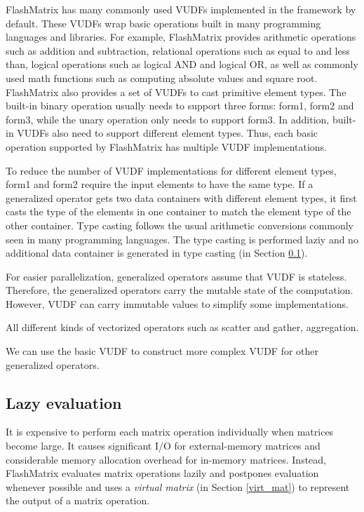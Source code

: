 FlashMatrix has many commonly used VUDFs implemented in the framework by default.
These VUDFs wrap basic operations built in many programming languages and
libraries. For example, FlashMatrix provides arithmetic operations such as addition
and subtraction, relational operations such as equal to and less than, logical
operations such as logical AND and logical OR, as well as commonly used
math functions such as computing absolute values and square root. FlashMatrix
also provides a set of VUDFs to cast primitive element types. The built-in
binary operation usually needs to support three forms: form1, form2 and form3,
while the unary operation only needs to support form3. In addition, built-in
VUDFs also need to support different element types. Thus, each basic operation
supported by FlashMatrix has multiple VUDF implementations.

To reduce the number of VUDF implementations for different element types, form1
and form2 require the input elements to have the same type. If a generalized
operator gets two data containers with different element types, it first casts
the type of the elements in one container to match the element type of the other
container. Type casting follows the usual arithmetic conversions \cite{}
commonly seen in many programming languages. The type casting is performed
laziy and no additional data container is generated in type casting
(in Section \ref{sec:lazy_eval}).

For easier parallelization, generalized operators assume that VUDF is stateless.
Therefore, the generalized operators carry the mutable state of the computation.
However, VUDF can carry immutable values to simplify some implementations.

All different kinds of vectorized operators such as scatter and gather, aggregation.

We can use the basic VUDF to construct more complex VUDF for other generalized operators.


\subsection{Lazy evaluation} \label{sec:lazy_eval}
It is expensive to perform each matrix operation individually when matrices
become large. It causes significant I/O for
external-memory matrices and considerable memory allocation overhead for
in-memory matrices. Instead, FlashMatrix evaluates matrix operations lazily
and postpones evaluation whenever possible and uses a \textit{virtual matrix}
(in Section \ref{virt_mat}) to represent the output of a matrix operation.

